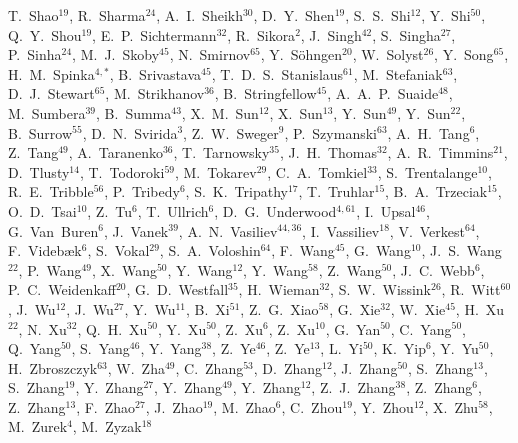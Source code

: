 {T.~Shao$^{19}$,
R.~Sharma$^{24}$,
A.~I.~Sheikh$^{30}$,
D.~Y.~Shen$^{19}$,
S.~S.~Shi$^{12}$,
Y.~Shi$^{50}$,
Q.~Y.~Shou$^{19}$,
E.~P.~Sichtermann$^{32}$,
R.~Sikora$^{2}$,
J.~Singh$^{42}$,
S.~Singha$^{27}$,
P.~Sinha$^{24}$,
M.~J.~Skoby$^{45}$,
N.~Smirnov$^{65}$,
Y.~S\"{o}hngen$^{20}$,
W.~Solyst$^{26}$,
Y.~Song$^{65}$,
H.~M.~Spinka$^{4,*}$,
B.~Srivastava$^{45}$,
T.~D.~S.~Stanislaus$^{61}$,
M.~Stefaniak$^{63}$,
D.~J.~Stewart$^{65}$,
M.~Strikhanov$^{36}$,
B.~Stringfellow$^{45}$,
A.~A.~P.~Suaide$^{48}$,
M.~Sumbera$^{39}$,
B.~Summa$^{43}$,
X.~M.~Sun$^{12}$,
X.~Sun$^{13}$,
Y.~Sun$^{49}$,
Y.~Sun$^{22}$,
B.~Surrow$^{55}$,
D.~N.~Svirida$^{3}$,
Z.~W.~Sweger$^{9}$,
P.~Szymanski$^{63}$,
A.~H.~Tang$^{6}$,
Z.~Tang$^{49}$,
A.~Taranenko$^{36}$,
T.~Tarnowsky$^{35}$,
J.~H.~Thomas$^{32}$,
A.~R.~Timmins$^{21}$,
D.~Tlusty$^{14}$,
T.~Todoroki$^{59}$,
M.~Tokarev$^{29}$,
C.~A.~Tomkiel$^{33}$,
S.~Trentalange$^{10}$,
R.~E.~Tribble$^{56}$,
P.~Tribedy$^{6}$,
S.~K.~Tripathy$^{17}$,
T.~Truhlar$^{15}$,
B.~A.~Trzeciak$^{15}$,
O.~D.~Tsai$^{10}$,
Z.~Tu$^{6}$,
T.~Ullrich$^{6}$,
D.~G.~Underwood$^{4,61}$,
I.~Upsal$^{46}$,
G.~Van~Buren$^{6}$,
J.~Vanek$^{39}$,
A.~N.~Vasiliev$^{44,36}$,
I.~Vassiliev$^{18}$,
V.~Verkest$^{64}$,
F.~Videb{\ae}k$^{6}$,
S.~Vokal$^{29}$,
S.~A.~Voloshin$^{64}$,
F.~Wang$^{45}$,
G.~Wang$^{10}$,
J.~S.~Wang$^{22}$,
P.~Wang$^{49}$,
X.~Wang$^{50}$,
Y.~Wang$^{12}$,
Y.~Wang$^{58}$,
Z.~Wang$^{50}$,
J.~C.~Webb$^{6}$,
P.~C.~Weidenkaff$^{20}$,
G.~D.~Westfall$^{35}$,
H.~Wieman$^{32}$,
S.~W.~Wissink$^{26}$,
R.~Witt$^{60}$,
J.~Wu$^{12}$,
J.~Wu$^{27}$,
Y.~Wu$^{11}$,
B.~Xi$^{51}$,
Z.~G.~Xiao$^{58}$,
G.~Xie$^{32}$,
W.~Xie$^{45}$,
H.~Xu$^{22}$,
N.~Xu$^{32}$,
Q.~H.~Xu$^{50}$,
Y.~Xu$^{50}$,
Z.~Xu$^{6}$,
Z.~Xu$^{10}$,
G.~Yan$^{50}$,
C.~Yang$^{50}$,
Q.~Yang$^{50}$,
S.~Yang$^{46}$,
Y.~Yang$^{38}$,
Z.~Ye$^{46}$,
Z.~Ye$^{13}$,
L.~Yi$^{50}$,
K.~Yip$^{6}$,
Y.~Yu$^{50}$,
H.~Zbroszczyk$^{63}$,
W.~Zha$^{49}$,
C.~Zhang$^{53}$,
D.~Zhang$^{12}$,
J.~Zhang$^{50}$,
S.~Zhang$^{13}$,
S.~Zhang$^{19}$,
Y.~Zhang$^{27}$,
Y.~Zhang$^{49}$,
Y.~Zhang$^{12}$,
Z.~J.~Zhang$^{38}$,
Z.~Zhang$^{6}$,
Z.~Zhang$^{13}$,
F.~Zhao$^{27}$,
J.~Zhao$^{19}$,
M.~Zhao$^{6}$,
C.~Zhou$^{19}$,
Y.~Zhou$^{12}$,
X.~Zhu$^{58}$,
M.~Zurek$^{4}$,
M.~Zyzak$^{18}$
}

\address{\rm{(STAR Collaboration)}}

